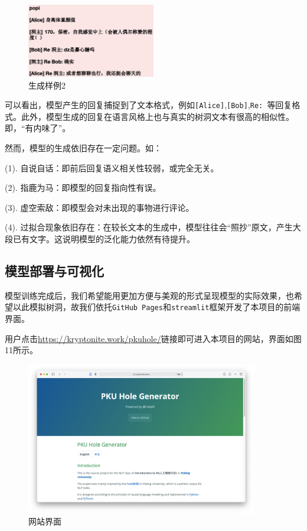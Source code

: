 \documentclass[12pt,a4paper]{article}
\begin{document}
\begin{figure}[!h]
        \centering
        \includegraphics[width=0.5\textwidth]{回复2.png}
        \caption{生成样例2}
\end{figure}

可以看出，模型产生的回复捕捉到了文本格式，例如\verb|[Alice]|,\verb|[Bob]|,\verb|Re: |等回复格式。此外，模型生成的回复在语言风格上也与真实的树洞文本有很高的相似性。即，“有内味了”。

然而，模型的生成依旧存在一定问题。如：

(1). 自说自话：即前后回复语义相关性较弱，或完全无关。

(2). 指鹿为马：即模型的回复指向性有误。

(3). 虚空索敌：即模型会对未出现的事物进行评论。

(4). 过拟合现象依旧存在：在较长文本的生成中，模型往往会“照抄”原文，产生大段已有文字。这说明模型的泛化能力依然有待提升。

\subsection{模型部署与可视化}
模型训练完成后，我们希望能用更加方便与美观的形式呈现模型的实际效果，也希望以此模拟树洞，故我们依托\verb|GitHub Pages|和\verb|streamlit|框架开发了本项目的前端界面。

用户点击\href{https://kryptonite.work/pkuhole/}{https://kryptonite.work/pkuhole/}链接即可进入本项目的网站，界面如图11所示。

\begin{figure}[!h]
        \centering
        \includegraphics[width=0.9\textwidth]{界面1.png}
        \caption{网站界面}
\end{figure}
\end{document}
